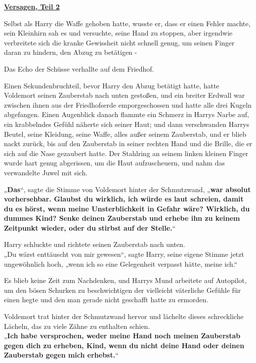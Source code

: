 

\hypertarget{versagen-teil-2}{%

\textbf{\uline{Versagen, Teil 2}}

Selbst als Harry die Waffe gehoben hatte, wusste er, dass er einen Fehler machte, sein Kleinhirn sah es und versuchte, seine Hand zu stoppen, aber irgendwie verbreitete sich die kranke Gewissheit nicht schnell genug, um seinen Finger daran zu hindern, den Abzug zu betätigen -

Das Echo der Schüsse verhallte auf dem Friedhof.

Einen Sekundenbruchteil, bevor Harry den Abzug betätigt hatte, hatte Voldemort seinen Zauberstab nach unten gestoßen, und ein breiter Erdwall war zwischen ihnen aus der Friedhofserde emporgeschossen und hatte alle drei Kugeln abgefangen. Einen Augenblick danach flammte ein Schmerz in Harrys Narbe auf, ein krabbelndes Gefühl näherte sich seiner Haut; und dann verschwanden Harrys Beutel, seine Kleidung, seine Waffe, alles außer seinem Zauberstab, und er blieb nackt zurück, bis auf den Zauberstab in seiner rechten Hand und die Brille, die er sich auf die Nase gezaubert hatte. Der Stahlring an seinem linken kleinen Finger wurde hart genug abgerissen, um die Haut aufzuscheuern, und nahm das verwandelte Juwel mit sich.

„\textbf{Das}“, sagte die Stimme von Voldemort hinter der Schmutzwand, „\textbf{war absolut vorhersehbar. Glaubst du wirklich, ich würde es laut schreien, damit du es hörst, wenn meine Unsterblichkeit in Gefahr wäre? Wirklich, du dummes Kind? Senke deinen Zauberstab und erhebe ihn zu keinem Zeitpunkt wieder, oder du stirbst auf der Stelle.}“

Harry schluckte und richtete seinen Zauberstab nach unten.\\ „Du wärst enttäuscht von mir gewesen“, sagte Harry, seine eigene Stimme jetzt ungewöhnlich hoch, „wenn ich so eine Gelegenheit verpasst hätte, meine ich.“

Es blieb keine Zeit zum Nachdenken, und Harrys Mund arbeitete auf Autopilot, um den bösen Schurken zu beschwichtigen der vielleicht väterliche Gefühle für einen hegte und den man gerade nicht geschafft hatte zu ermorden.

Voldemort trat hinter der Schmutzwand hervor und lächelte dieses schreckliche Lächeln, das zu viele Zähne zu enthalten schien.\\ „\textbf{Ich habe versprochen, weder meine Hand noch meinen Zauberstab gegen dich zu erheben, Kind, wenn du nicht deine Hand oder deinen Zauberstab gegen mich erhebst.}“

}
